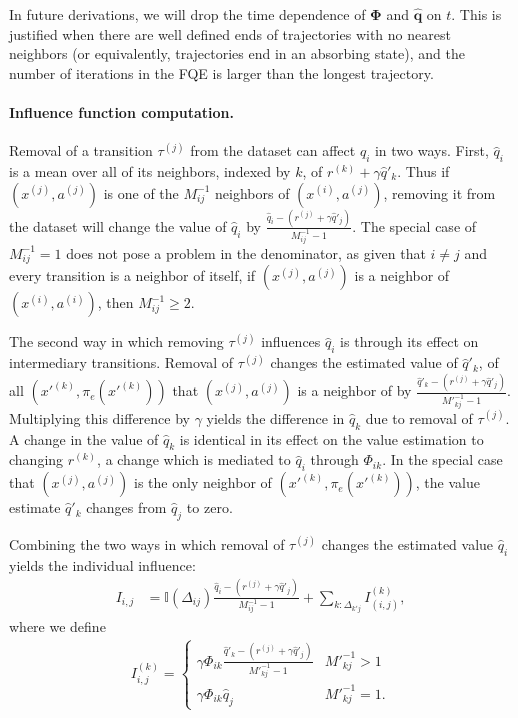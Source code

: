 \documentclass{article}
\begin{document}
In future derivations, we will drop the time dependence of $\mathbf{\Phi}$ and $\hat{\mathbf{q}}$ on $t$. This is justified when there are well defined ends of trajectories with no nearest neighbors (or equivalently, trajectories end in an absorbing state), and the number of iterations in the FQE is larger than the longest trajectory.

\paragraph{Influence function computation.}

Removal of a transition $\tau^{(j)}$ from the dataset can affect $\hat{q}_i$ in two ways. First, $\hat{q}_i$ is a mean over all of its neighbors, indexed by $k$, of $r^{(k)} + \gamma \hat{q}'_k$. Thus if $(x^{(j)}, a^{(j)})$ is one of the $M^{-1}_{ij}$ neighbors of $(x^{(i)}, a^{(j)})$, removing it from the dataset will change the value of $\hat{q}_i$ by $\frac{\hat{q}_{i} - \left( r^{(j)} + \gamma \hat{q}'_{j} \right)}{M_{ij}^{-1} - 1}$. The special case of $M^{-1}_{ij} = 1$ does not pose a problem in the denominator, as given that $i \neq j$ and every transition is a neighbor of itself, if $(x^{(j)}, a^{(j)})$ is a neighbor of $(x^{(i)}, a^{(i)})$, then $M^{-1}_{ij} \geq 2$.

The second way in which removing $\tau^{(j)}$ influences $\hat{q}_i$ is through its effect on intermediary transitions. Removal of $\tau^{(j)}$ changes the estimated value of $\hat{q}'_k$, of all $(x'^{(k)}, \pi_e(x'^{(k)}))$ that $(x^{(j)}, a^{(j)})$ is a neighbor of by $\frac{\hat{q}'_{k} - \left( r^{(j)} + \gamma \hat{q}'_{j} \right)}{M'^{-1}_{kj} - 1}$. Multiplying this difference by $\gamma$ yields the difference in $\hat{q}_{k}$ due to removal of $\tau^{(j)}$. A change in the value of $\hat{q}_{k}$ is identical in its effect on the value estimation to changing $r^{(k)}$, a change which is mediated to $\hat{q}_i$ through $\Phi_{ik}$. In the special case that $(x^{(j)}, a^{(j)})$ is the only neighbor of $(x'^{(k)}, \pi_e(x'^{(k)}))$, the value estimate $\hat{q}'_k$ changes from $\hat{q}_j$ to zero.

Combining the two ways in which removal of $\tau^{(j)}$ changes the estimated value $\hat{q}_i$ yields the individual influence:
\begin{align}
    I_{i, j} &= \mathbb{I}(\Delta_{ij}) \frac{\hat{q}_{i} - \left( r^{(j)} + \gamma \hat{q}'_{j} \right)}{M_{ij}^{-1} - 1} + \sum_{k:\Delta_{k'j}} I_{(i, j)}^{(k)},
\end{align}
where we define
\begin{align}
    I_{i, j}^{(k)} =
    \begin{cases} 
      \gamma \Phi_{ik} \frac{\hat{q}'_{k} - \left( r^{(j)} + \gamma \hat{q}'_j \right)}{M'^{-1}_{kj} - 1} & M'^{-1}_{kj} > 1 \\
      \gamma \Phi_{ik} \hat{q}_j & M'^{-1}_{kj} = 1.
   \end{cases}
\end{align}
\end{document}
